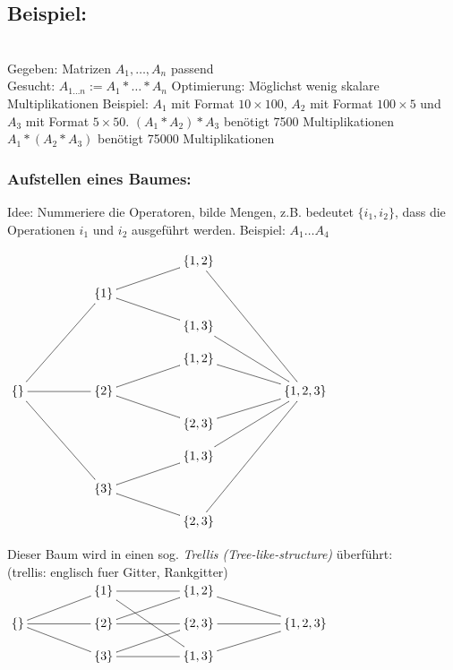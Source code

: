 \documentclass[a4paper]{scrartcl}
\begin{document}
\subsection{Beispiel:}\ \\
Gegeben: Matrizen $A_1,\ldots,A_n$ passend\\
Gesucht: $A_{1\ldots n} := A_1 \ast \ldots \ast A_n$
Optimierung: Möglichst wenig skalare Multiplikationen
Beispiel: $A_1$ mit Format $10\times 100$, $A_2$ mit Format $100\times 5$ und $A_3$ mit Format $5\times 50$.
$(A_1 \ast A_2)\ast A_3$ benötigt 7500 Multiplikationen
$A_1 \ast (A_2 \ast A_3)$ benötigt 75000 Multiplikationen
\subsubsection{Aufstellen eines Baumes:}
Idee: Nummeriere die Operatoren, bilde Mengen, z.B. bedeutet $\{i_1, i_2\}$, dass die Operationen $i_1$ und $i_2$ ausgeführt werden.
Beispiel: $A_1\ldots A_4$
\begin{center}
$\begin{xy}
		\xymatrix @R=10pt @C=50pt {
	  	*{} & *{} & \{1,2\} \ar@{-}[rdddd]& *{}\\ 
	  	*{} & \{1\} \ar@{-}[ru]\ar@{-}[rd]& *{} & *{} \\ 
	  	*{} & *{} & \{1,3\} \ar@{-}[rdd]& *{} \\
	  	*{} & *{} & \{1,2\} \ar@{-}[rd]& *{} \\
	  	\{\} \ar@{-}[ruuu]\ar@{-}[r]\ar@{-}[rddd]& \{2\} \ar@{-}[ru]\ar@{-}[rd]& *{} & \{1,2,3\} \\
	  	*{} & *{} & \{2,3\} \ar@{-}[ru]& *{} \\
	  	*{} & *{} & \{1,3\} \ar@{-}[ruu]& *{} \\
	  	*{} & \{3\} \ar@{-}[ru]\ar@{-}[rd]& *{} & *{} \\	  	
	  	*{} & *{} & \{2,3\} \ar@{-}[ruuuu]& *{} \\	  	
		}
\end{xy}$
\end{center}

Dieser Baum wird in einen sog. \emph{Trellis (Tree-like-structure)} überführt:\\
(trellis: englisch fuer Gitter, Rankgitter)\\
$\begin{xy}
		\xymatrix @R=10pt @C=50pt {
	  	*{} & \{1\} \ar@{-}[r]\ar@{-}[rdd]& \{1,2\}\ar@{-}[rd] & *{} \\ 
	  	\{\} \ar@{-}[ru]\ar@{-}[r]\ar@{-}[rd]& \{2\} \ar@{-}[ru]\ar@{-}[r]& \{2,3\}\ar@{-}[r] & \{1,2,3\} \\
	  	*{} & \{3\} \ar@{-}[r]\ar@{-}[ru]& \{1,3\}\ar@{-}[ru] & *{} \\	  	
		}
\end{xy}$
\end{document}
